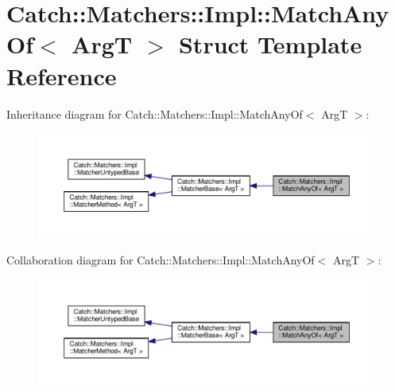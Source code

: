 \hypertarget{structCatch_1_1Matchers_1_1Impl_1_1MatchAnyOf}{}\section{Catch\+:\+:Matchers\+:\+:Impl\+:\+:Match\+Any\+Of$<$ ArgT $>$ Struct Template Reference}
\label{structCatch_1_1Matchers_1_1Impl_1_1MatchAnyOf}


Inheritance diagram for Catch\+:\+:Matchers\+:\+:Impl\+:\+:Match\+Any\+Of$<$ ArgT $>$\+:
\nopagebreak
\begin{figure}[H]
\begin{center}
\leavevmode
\includegraphics[width=350pt]{structCatch_1_1Matchers_1_1Impl_1_1MatchAnyOf__inherit__graph}
\end{center}
\end{figure}


Collaboration diagram for Catch\+:\+:Matchers\+:\+:Impl\+:\+:Match\+Any\+Of$<$ ArgT $>$\+:
\nopagebreak
\begin{figure}[H]
\begin{center}
\leavevmode
\includegraphics[width=350pt]{structCatch_1_1Matchers_1_1Impl_1_1MatchAnyOf__coll__graph}
\end{center}
\end{figure}
